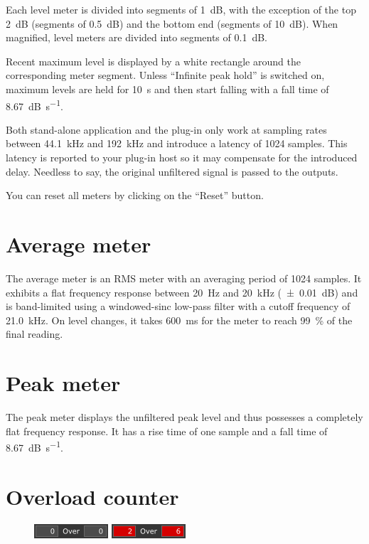 Each level meter is divided into segments of \SI{1}{\dB}, with the
exception of the top \SI{2}{\dB} (segments of \SI{0.5}{\dB}) and the
bottom end (segments of \SI{10}{\dB}).  When magnified, level meters
are divided into segments of \SI{0.1}{\dB}.

Recent maximum level is displayed by a white rectangle around the
corresponding meter segment.  Unless ``Infinite peak hold'' is
switched on, maximum levels are held for \SI{10}{\second} and then
start falling with a fall time of \SI{8.67}{\dB\per\second}.

Both stand-alone application and the plug-in only work at sampling
rates between \SI{44.1}{\kilo\hertz} and \SI{192}{\kilo\hertz} and
introduce a latency of \num{1024} samples.  This latency is reported
to your plug-in host so it may compensate for the introduced delay.
Needless to say, the original unfiltered signal is passed to the
outputs.

You can reset all meters by clicking on the ``Reset'' button.

\section{Average meter}

The average meter is an RMS meter with an averaging period of
\num{1024} samples.  It exhibits a flat frequency response between
\SI{20}{\hertz} and \SI{20}{\kilo\hertz} (\SI{\pm 0.01}{\dB}) and is
band-limited using a windowed-sinc low-pass filter with a cutoff
frequency of \SI{21.0}{\kilo\hertz}.  On level changes, it takes
\SI{600}{\milli\second} for the meter to reach \SI{99}{\percent} of
the final reading.

\section{Peak meter}

The peak meter displays the unfiltered peak level and thus possesses a
completely flat frequency response.  It has a rise time of one sample
and a fall time of \SI{8.67}{\dB\per\second}.

\newpage %

\section{Overload counter}

\begin{figure}
  \includegraphics[scale=\screenshotscale,clip]{include/images/overload_counter_normal.png}
  \newline \vspace{-0.9\baselineskip}
  \includegraphics[scale=\screenshotscale,clip]{include/images/overload_counter_clipped.png}
\end{figure}

